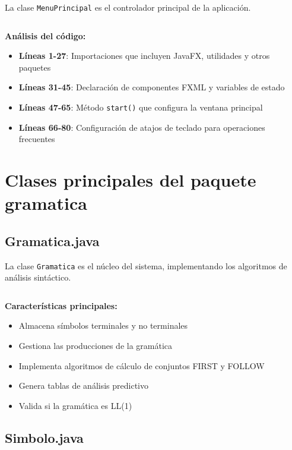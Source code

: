 La clase \texttt{MenuPrincipal} es el controlador principal de la aplicación.

\inputminted[linenos,breaklines,firstline=1,lastline=50]{java}{codigo/src/bienvenida/MenuPrincipal.java}

\textbf{Análisis del código:}

\begin{itemize}
    \item \textbf{Líneas 1-27}: Importaciones que incluyen JavaFX, utilidades y otros paquetes
    \item \textbf{Líneas 31-45}: Declaración de componentes FXML y variables de estado
    \item \textbf{Líneas 47-65}: Método \texttt{start()} que configura la ventana principal
    \item \textbf{Líneas 66-80}: Configuración de atajos de teclado para operaciones frecuentes
\end{itemize}

\section{Clases principales del paquete gramatica}

\subsection{Gramatica.java}

La clase \texttt{Gramatica} es el núcleo del sistema, implementando los algoritmos de análisis sintáctico.

\inputminted[linenos,breaklines,firstline=1,lastline=50]{java}{codigo/src/gramatica/Gramatica.java}

\textbf{Características principales:}

\begin{itemize}
    \item Almacena símbolos terminales y no terminales
    \item Gestiona las producciones de la gramática
    \item Implementa algoritmos de cálculo de conjuntos FIRST y FOLLOW
    \item Genera tablas de análisis predictivo
    \item Valida si la gramática es LL(1)
\end{itemize}

\subsection{Simbolo.java}

